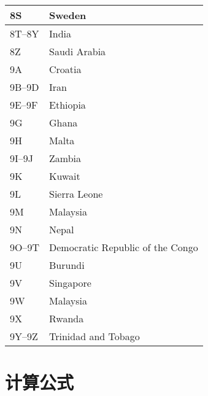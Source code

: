 \begin{longtable}{|l|l|}
  \hline
  8S                  & Sweden                                    \\
  \hline
  8T--8Y              & India                                     \\
  \hline
  8Z                  & Saudi Arabia                              \\
  \hline
  9A                  & Croatia                                   \\
  \hline
  9B--9D              & Iran                                      \\
  \hline
  9E--9F              & Ethiopia                                  \\
  \hline
  9G                  & Ghana                                     \\
  \hline
  9H                  & Malta                                     \\
  \hline
  9I--9J              & Zambia                                    \\
  \hline
  9K                  & Kuwait                                    \\
  \hline
  9L                  & Sierra Leone                              \\
  \hline
  9M                  & Malaysia                                  \\
  \hline
  9N                  & Nepal                                     \\
  \hline
  9O--9T              & Democratic Republic of the Congo          \\
  \hline
  9U                  & Burundi                                   \\
  \hline
  9V                  & Singapore                                 \\
  \hline
  9W                  & Malaysia                                  \\
  \hline
  9X                  & Rwanda                                    \\
  \hline
  9Y--9Z              & Trinidad and Tobago                       \\
  \hline
\end{longtable}

\newpage

\section{计算公式}

